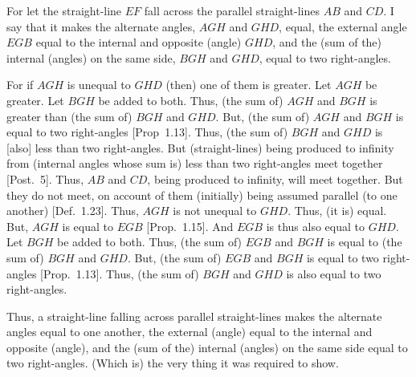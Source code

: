 \begin{Parallel}{}{}
{For let the straight-line $EF$ fall across the parallel straight-lines $AB$ and $CD$.
I say that it makes the  alternate angles, $AGH$ and $GHD$,  equal,  the
external angle $EGB$ equal to the internal and opposite (angle) $GHD$,
and the (sum of the) internal (angles) on the same side, $BGH$ and $GHD$, equal to
two right-angles.

For if $AGH$ is unequal to $GHD$ (then) one of them is greater. Let $AGH$ be greater.
Let $BGH$ be added to both. Thus, (the sum of) $AGH$ and $BGH$ is greater
than (the sum of) $BGH$ and $GHD$. But, (the sum of) $AGH$ and $BGH$ is equal to two right-angles
[Prop~1.13]. Thus,  (the sum of) $BGH$ and $GHD$ is [also] less than two right-angles. 
But (straight-lines) being produced to infinity from (internal angles whose sum is) less than
two right-angles meet together [Post.~5]. Thus, $AB$ and $CD$, being produced to
infinity, will meet together. But they do not meet, on account of
them (initially) being assumed parallel (to one another) [Def.~1.23]. Thus, $AGH$ is not unequal to $GHD$. Thus, (it is) equal. But, $AGH$ is equal to $EGB$ [Prop.~1.15]. 
And $EGB$ is thus also equal to $GHD$.
Let $BGH$
be added to both. Thus, (the sum of) $EGB$ and $BGH$ is equal to (the sum of) $BGH$ and $GHD$.
But, (the sum of) $EGB$ and $BGH$ is equal to two right-angles [Prop.~1.13]. 
Thus, (the sum of) $BGH$ and $GHD$ is also equal to two right-angles.

\epsfysize=2.2in
\centerline{}

Thus, a straight-line falling across parallel straight-lines makes the alternate angles
equal to one another,  the external (angle) equal to the internal and
opposite (angle), and the (sum of the) internal (angles) on the same side equal to
two right-angles. (Which is) the very thing it was required to show.}
\end{Parallel}

